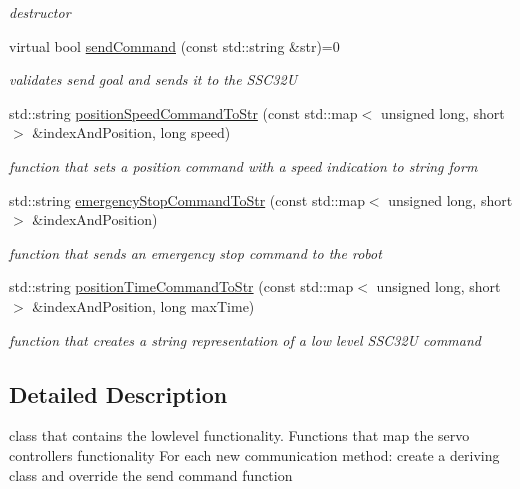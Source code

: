 \begin{DoxyCompactItemize}
\begin{DoxyCompactList}\small\item\em destructor \end{DoxyCompactList}\item 
virtual bool \hyperlink{classRobotInterface_1_1LowLevel_1_1ICommunication_a88fc73dd43eb0444895e1a8b33fc1623}{send\+Command} (const std\+::string \&str)=0
\begin{DoxyCompactList}\small\item\em validates send goal and sends it to the S\+S\+C32U \end{DoxyCompactList}\item 
std\+::string \hyperlink{classRobotInterface_1_1LowLevel_1_1ICommunication_aece444b8550301f7d65d1580581a1e62}{position\+Speed\+Command\+To\+Str} (const std\+::map$<$ unsigned long, short $>$ \&index\+And\+Position, long speed)
\begin{DoxyCompactList}\small\item\em function that sets a position command with a speed indication to string form \end{DoxyCompactList}\item 
std\+::string \hyperlink{classRobotInterface_1_1LowLevel_1_1ICommunication_a107a620b30d9aef6565bbe26a6308b73}{emergency\+Stop\+Command\+To\+Str} (const std\+::map$<$ unsigned long, short $>$ \&index\+And\+Position)
\begin{DoxyCompactList}\small\item\em function that sends an emergency stop command to the robot \end{DoxyCompactList}\item 
std\+::string \hyperlink{classRobotInterface_1_1LowLevel_1_1ICommunication_a92c27d361d72d13460ee20c3241c4a5d}{position\+Time\+Command\+To\+Str} (const std\+::map$<$ unsigned long, short $>$ \&index\+And\+Position, long max\+Time)
\begin{DoxyCompactList}\small\item\em function that creates a string representation of a low level S\+S\+C32U command \end{DoxyCompactList}\end{DoxyCompactItemize}


\subsection{Detailed Description}
class that contains the lowlevel functionality. Functions that map the servo controller\textquotesingle{}s functionality For each new communication method\+: create a deriving class and override the send command function 

